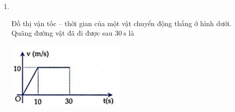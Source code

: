 \begin{enumerate}[label=\bfseries Câu \arabic*:,leftmargin=1.5cm]
\item {}\\
{\begin{minipage}[l]{0.6\textwidth}
		Đồ thị vận tốc – thời gian của một vật chuyển động thẳng ở hình dưới. Quãng đường vật đã đi được sau $\SI{30}{\second}$ là
	\end{minipage}
	\begin{minipage}{0.4\textwidth}
		\begin{center}
			\includegraphics[width=0.7\linewidth]{../figs/VN10-2022-PH-TP008-P-2}
		\end{center}
	\end{minipage}
}


\end{enumerate}
